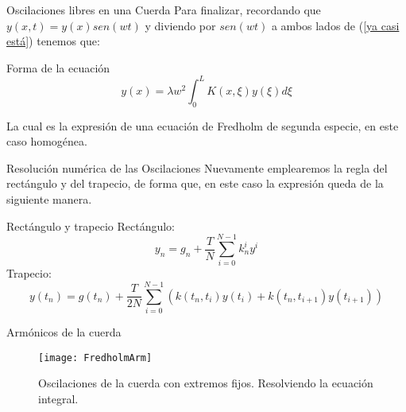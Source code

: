 \documentclass{beamer}
\begin{document}
\begin{frame}{Oscilaciones libres en una Cuerda}
    Para finalizar, recordando que $y(x,t)= y(x)sen(wt)$ y diviendo por $sen(wt)$ a ambos lados de (\ref{ya casi está}) tenemos que:
    \begin{block}{Forma de la ecuación}
        \begin{equation}
            y(x)= \lambda w^2\int^L_0 K(x,\xi)y(\xi) d\xi
        \end{equation}
    \end{block}
    La cual es la expresión de una ecuación de Fredholm de segunda especie, en este caso homogénea.
\end{frame}

\begin{frame}{Resolución numérica de las Oscilaciones}
    Nuevamente emplearemos la regla del rectángulo y del trapecio, de forma que, en este caso la expresión queda de la siguiente manera.
    \begin{block}{Rectángulo y trapecio}
        Rectángulo:
        \begin{equation}
            y_n = g_n + \frac{T}{N} \sum_{i=0}^{N-1} k_n^i y^i
        \end{equation}
        Trapecio:
        \begin{equation}
            y(t_n) = g(t_n) + \frac{T}{2N}\sum_{i=0}^{N-1} \left(k(t_n, t_i)y(t_i) + k(t_n, t_{i+1})y(t_{i+1})\right)
        \end{equation}
    \end{block}
    
\end{frame}

\begin{frame}{Armónicos de la cuerda}
\begin{figure}
    \centering
    \texttt{[image: FredholmArm]}
    \caption{Oscilaciones de la cuerda con extremos fijos. Resolviendo la ecuación integral.}
    \label{fig:enter-label}
\end{figure}
\end{frame}
\end{document}
